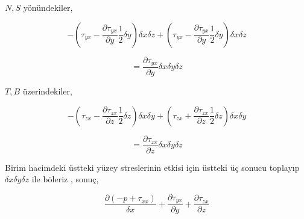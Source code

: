 $N,S$ yönündekiler,

$$
- \left( \tau_{yx} - \frac{\partial \tau_{yx}}{\partial y}  \frac{1}{2} \delta y
\right) \delta x \delta z  +
\left( \tau_{yx} - \frac{\partial \tau_{yx}}{\partial y}  \frac{1}{2} \delta y
\right) \delta x \delta z  
$$

$$
= \frac{\partial \tau_{yx}}{\partial y} \delta x \delta y \delta z 
$$

$T,B$ üzerindekiler,

$$
- \left(
\tau_{zx} - \frac{\partial \tau_{zx}}{\partial z} \frac{1}{2} \delta z
\right) \delta x \delta y +
\left(
\tau_{zx} + \frac{\partial \tau_{zx}}{\partial z} \frac{1}{2} \delta z
\right) \delta x \delta y 
$$

$$
= \frac{\partial \tau_{zx}}{\partial z} \delta x \delta y \delta z 
$$

Birim hacimdeki üstteki yüzey streslerinin etkisi için üstteki üç sonucu
toplayıp $\delta x \delta y \delta z $ ile böleriz , sonuç,

$$
\frac{\partial (-p + \tau_{xx})}{\delta x} +
\frac{\partial \tau_{yx}}{\partial y} +
\frac{\partial \tau_{zx}}{\partial z} 
$$

